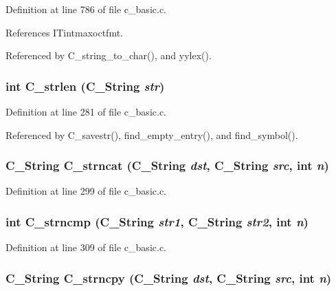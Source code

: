 Definition at line 786 of file c\_\-basic.c.

References ITintmaxoctfmt.

Referenced by C\_\-string\_\-to\_\-char(), and yylex().
\subsubsection{\setlength{\rightskip}{0pt plus 5cm}int C\_\-strlen (\bf{C\_\-String} {\em str})}\label{c__basic_8h_fee59d2befb71fb91885019f5db7e90e}




Definition at line 281 of file c\_\-basic.c.

Referenced by C\_\-savestr(), find\_\-empty\_\-entry(), and find\_\-symbol().
\subsubsection{\setlength{\rightskip}{0pt plus 5cm}\bf{C\_\-String} C\_\-strncat (\bf{C\_\-String} {\em dst}, \bf{C\_\-String} {\em src}, int {\em n})}\label{c__basic_8h_301fe5d1daaaca499b82caa6f3dc4121}




Definition at line 299 of file c\_\-basic.c.
\subsubsection{\setlength{\rightskip}{0pt plus 5cm}int C\_\-strncmp (\bf{C\_\-String} {\em str1}, \bf{C\_\-String} {\em str2}, int {\em n})}\label{c__basic_8h_0b4a4f69d0dd1cc1cb27c805a435fe3e}




Definition at line 309 of file c\_\-basic.c.
\subsubsection{\setlength{\rightskip}{0pt plus 5cm}\bf{C\_\-String} C\_\-strncpy (\bf{C\_\-String} {\em dst}, \bf{C\_\-String} {\em src}, int {\em n})}\label{c__basic_8h_7686316289a8d891cb8fbb45e34cb502}




